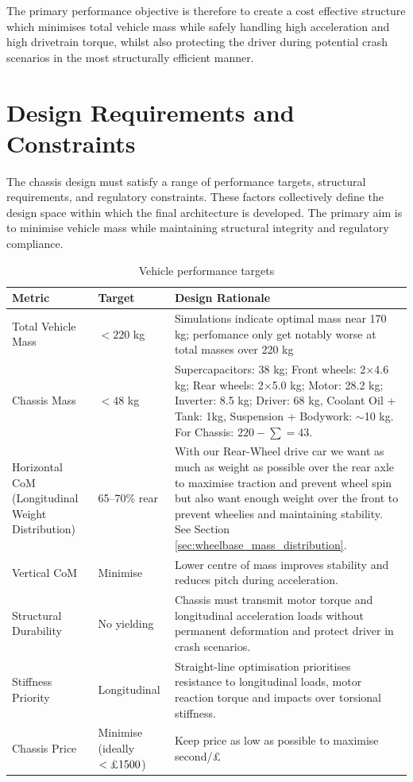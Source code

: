 \documentclass[11pt, a4paper]{report}
\numberwithin{equation}{section}
\begin{document}
\begin{refsection}
The primary performance objective is therefore to create a cost effective structure which minimises total vehicle mass while safely handling high acceleration and high drivetrain torque, whilst also protecting the driver during potential crash scenarios in the most structurally efficient manner.

\section{Design Requirements and Constraints}

The chassis design must satisfy a range of performance targets, structural requirements, and regulatory constraints. These factors collectively define the design space within which the final architecture is developed. The primary aim is to minimise vehicle mass while maintaining structural integrity and regulatory compliance. 

\begin{table}[H]
\centering
\caption{Vehicle performance targets}
\vspace{-8pt}
\label{tab:performance_targets}
\footnotesize
\singlespacing
\begin{tabularx}{\textwidth}{|p{3.2cm}|p{2.2cm}|X|}
\hline
\textbf{Metric} & \textbf{Target} & \textbf{Design Rationale} \\
\hline
Total Vehicle Mass & $<220$ kg & Simulations indicate optimal mass near 170 kg; perfomance only get notably worse at total masses over 220 kg \\
\hline
Chassis Mass & $<48$ kg & Supercapacitors: 38 kg; Front wheels: 2$\times$4.6 kg; Rear wheels: 2$\times$5.0 kg; Motor: 28.2 kg; Inverter: 8.5 kg; Driver: 68 kg, Coolant Oil + Tank: 1kg, Suspension + Bodywork: $\sim$10 kg. For Chassis: $220 - \sum = 43$. \\
\hline
Horizontal CoM (Longitudinal Weight Distribution) & 65--70\% rear & With our Rear-Wheel drive car we want as much as weight as possible over the rear axle to maximise traction and prevent wheel spin but also want enough weight over the front to prevent wheelies and maintaining stability. See Section \ref{sec:wheelbase_mass_distribution}.\\
\hline
Vertical CoM & Minimise & Lower centre of mass improves stability and reduces pitch during acceleration. \\
\hline
Structural Durability & No yielding & Chassis must transmit motor torque and longitudinal acceleration loads without permanent deformation and protect driver in crash scenarios. \\
\hline
Stiffness Priority & Longitudinal & Straight-line optimisation prioritises resistance to longitudinal loads, motor reaction torque and impacts over torsional stiffness. \\
\hline
Chassis Price & Minimise (ideally $<\text{\pounds}1500$) & Keep price as low as possible to maximise second/£ \\
\hline
\end{tabularx}
\end{table}
\vspace{-10pt}


\end{refsection}
\end{document}
